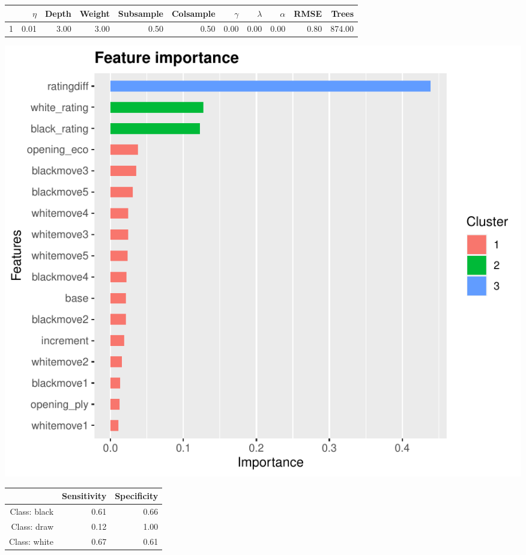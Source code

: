 \documentclass[12pt,preprint, authoryear]{elsarticle}
\let\origfigure\figure
\let\endorigfigure\endfigure
\renewenvironment{figure}[1][2] {
    \expandafter\origfigure\expandafter[H]
} {
    \endorigfigure
}
\let\origtable\table
\let\endorigtable\endtable
\renewenvironment{table}[1][2] {
    \expandafter\origtable\expandafter[H]
} {
    \endorigtable
}
\numberwithin{equation}{section}
\numberwithin{figure}{section}
\numberwithin{table}{section}
\begin{document}
\begin{table}[H]
\centering
\begin{tabular}{rrrrrrrrrrr}
  \hline
 & $\eta$ & Depth & Weight & Subsample & Colsample& $\gamma$ & $\lambda$ & $\alpha$ & RMSE & Trees \\ 
  \hline
1 & 0.01 & 3.00 & 3.00 & 0.50 & 0.50 & 0.00 & 0.00 & 0.00 & 0.80 & 874.00 \\ 
   \hline
\end{tabular}
\caption{Hypergrid Full Sample} 
\end{table}

\begin{figure}[H]

{\centering \includegraphics{WriteUp_files/figure-latex/importfullsamp2-1} 

}

\caption{Importance of Features for Tuned Model: Full Sample\label{Figure9}}\label{fig:importfullsamp2}
\end{figure}

\begin{table}[ht]
\centering
\begin{tabular}{rrr}
  \hline
 & Sensitivity & Specificity \\ 
  \hline
Class: black & 0.61 & 0.66 \\ 
  Class: draw & 0.12 & 1.00 \\ 
  Class: white & 0.67 & 0.61 \\ 
   \hline
\end{tabular}
\caption{Accuracy Full Sample: Tuned Model} 
\end{table}
\end{document}
